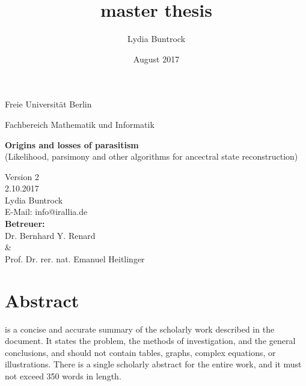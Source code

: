 
\author{Lydia Buntrock}
\title{master thesis}
\date{August 2017}


  \begin{titlepage}
    \pagestyle{empty}
  	\begin{center}
      {\Large Freie Universität Berlin}\\
    	\begin{Huge}
      	Fachbereich Mathematik und Informatik\\
      	\vspace{3mm}
    	\end{Huge}
    	\vspace{20mm}
    	\begin{Large}
    	    \textbf{Origins and losses of parasitism}\\
          (Likelihood, parsimony and other algorithms for ancectral state reconstruction)\\
    	\end{Large}
    	\vspace{8mm}
      Version 2\\
      2.10.2017\\
    	\vspace{2cm}
    	Lydia Buntrock \\
      E-Mail: info@irallia.de\\
     	\vspace{5cm}
      \textbf{Betreuer:}\\
      Dr. Bernhard Y. Renard\\
      \& \\
      Prof. Dr. rer. nat. Emanuel Heitlinger\\      
  	\end{center}
  	\clearpage
  \end{titlepage}

\chapter*{Abstract}
   is a concise and accurate summary of the scholarly work described in the 
  document. It states the problem, the methods of investigation, and the general conclusions, and 
  should not contain tables, graphs, complex equations, or illustrations. There is a single 
  scholarly abstract for the entire work, and it must not exceed 350 words in length.

